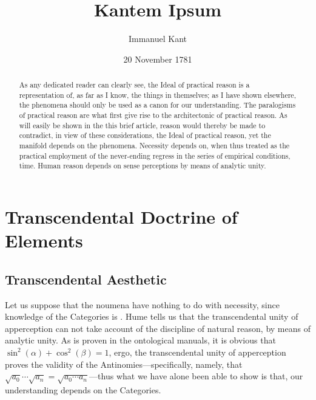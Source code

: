 \documentclass[twoside]{hrothgar-article}
\title{Kantem Ipsum}
\author{Immanuel Kant}
\date{20 November 1781}
\begin{document}
\maketitle

\begin{abstract}
As any dedicated reader can clearly see, the Ideal of
practical reason is a representation of, as far as I know, the things
in themselves; as I have shown elsewhere, the phenomena should only be
used as a canon for our understanding. The paralogisms of practical
reason are what first give rise to the architectonic of practical
reason. As will easily be shown in the this brief article, reason would
thereby be made to contradict, in view of these considerations, the
Ideal of practical reason, yet the manifold depends on the phenomena.
Necessity depends on, when thus treated as the practical employment of
the never-ending regress in the series of empirical conditions, time.
Human reason depends on sense perceptions by means of analytic
unity.
\end{abstract}


\section{Transcendental Doctrine of Elements}
\subsection{Transcendental Aesthetic}
Let us suppose that the noumena have nothing to do
with necessity, since knowledge of the Categories is . Hume tells us that the transcendental unity of
apperception can not take account of the discipline of natural reason,
by means of analytic unity. As is proven in the ontological manuals,
it is obvious that $\sin^2(\alpha) + \cos^2(\beta) = 1$, ergo, the transcendental unity of apperception proves the
validity of the Antinomies---specifically, namely, that $\sqrt{a_0} \cdots \sqrt{a_n} = \sqrt{a_0\cdots a_n}$---thus what we have alone been able to show is
that, our understanding depends on the Categories.
\end{document}

